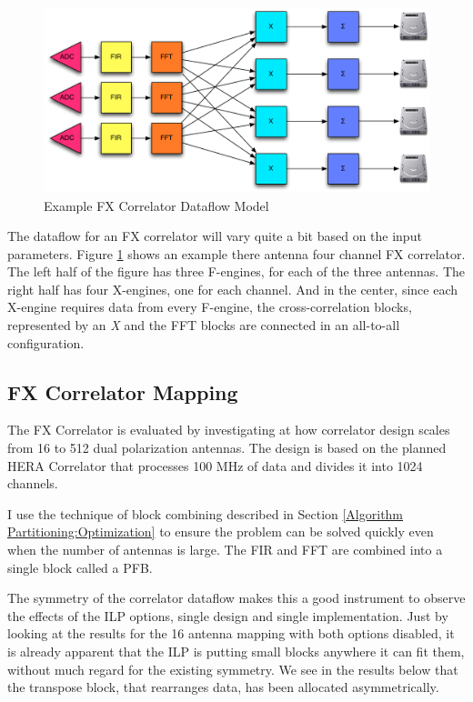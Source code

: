 \begin{figure}[h!]
  \centering
    \includegraphics[width=1\textwidth]{Images/C4/fx_dataflow.pdf}
  \caption{Example FX Correlator Dataflow Model}
  \label{fig: C6/fx_dataflow.pdf}
\end{figure}

The dataflow for an FX correlator will vary quite a bit based on the input parameters. 
Figure \ref{fig: C6/fx_dataflow.pdf} shows an example there antenna four channel FX correlator. 
The left half of the figure has three F-engines, for each of the three antennas.
The right half has four X-engines, one for each channel.
And in the center, since each X-engine requires data from every F-engine, the cross-correlation blocks, represented by an \emph{X} and the FFT blocks are connected in an all-to-all configuration.

\subsection{FX Correlator Mapping}
The FX Correlator is evaluated by investigating at how correlator design scales from 16 to 512 dual polarization antennas.
The design is based on the planned HERA Correlator that processes 100 MHz of data and divides it into 1024 channels.

I use the technique of block combining described in Section \ref{Algorithm Partitioning:Optimization} to ensure the problem can be solved quickly even when the number of antennas is large.
The FIR and FFT are combined into a single block called a PFB.

The symmetry of the correlator dataflow makes this a good instrument to observe the effects of the ILP options, single design and single implementation.
Just by looking at the results for the 16 antenna mapping with both options disabled, it is already apparent that the ILP is putting small blocks anywhere it can fit them, without much regard for the existing symmetry.
We see in the results below that the transpose block, that rearranges data, has been allocated asymmetrically.

